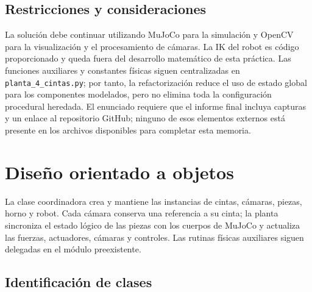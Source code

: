\documentclass[12pt,a4paper]{article}
\begin{document}
\subsection{Restricciones y consideraciones}

La solución debe continuar utilizando MuJoCo para la simulación y OpenCV para
la visualización y el procesamiento de cámaras. La IK del robot es código
proporcionado y queda fuera del desarrollo matemático de esta práctica. Las
funciones auxiliares y constantes físicas siguen centralizadas en
\texttt{planta\_4\_cintas.py}; por tanto, la refactorización reduce el uso de
estado global para los componentes modelados, pero no elimina toda la
configuración procedural heredada. El enunciado requiere que el informe final
incluya capturas y un enlace al repositorio GitHub; ninguno de esos elementos
externos está presente en los archivos disponibles para completar esta memoria.


\section{Diseño orientado a objetos}

La clase coordinadora crea y mantiene las instancias de cintas, cámaras,
piezas, horno y robot. Cada cámara conserva una referencia a su cinta; la
planta sincroniza el estado lógico de las piezas con los cuerpos de MuJoCo y
actualiza las fuerzas, actuadores, cámaras y controles. Las rutinas físicas
auxiliares siguen delegadas en el módulo preexistente.

\subsection{Identificación de clases}
\end{document}
